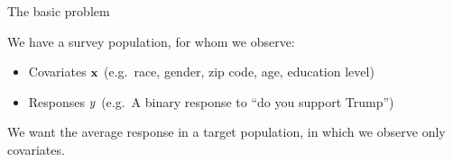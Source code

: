 
\begin{frame}{The basic problem}


We have a survey population, for whom we observe:
%
\begin{itemize}
 \item Covariates $\mathbf{x}$ (e.g.~race, gender, zip code, age, education level)
 \item Responses $y$ (e.g.~A binary response to ``do you support Trump'')
\end{itemize}
%

We want the average response in a target population,
in which we observe only covariates.


\end{frame}
